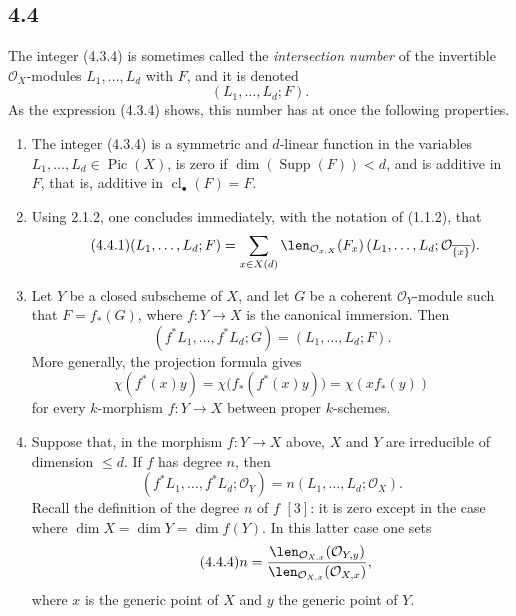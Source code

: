 \documentclass[11pt]{article}
\newcommand{\cl}{\operatorname{cl}}
\providecommand{\Pic}{\operatorname{Pic}}
\providecommand{\Supp}{\operatorname{Supp}}
\begin{document}
\subsection*{4.4}
The integer (4.3.4) is sometimes called the \emph{intersection number} of the invertible \(\mathcal O_X\)-modules \(L_1,\ldots,L_d\) with \(F\), and it is denoted
\[
 (L_1,\ldots,L_d;F).
\]
As the expression (4.3.4) shows, this number has at once the following properties.

\begin{enumerate}[label=\arabic*)]
\item The integer (4.3.4) is a symmetric and \(d\)-linear function in the variables \(L_1,\ldots,L_d\in\Pic(X)\), is zero if \(\dim(\Supp(F))<d\), and is additive in \(F\), that is, additive in \(\cl_\bullet(F)=F\).

\item Using 2.1.2, one concludes immediately, with the notation of (1.1.2), that
\begin{equation}\tag{4.4.1}
 (L_1,\ldots,L_d;F)=
 \sum_{x\in X(d)}
 \len_{\mathcal O_{x,X}}(F_x)\,
 (L_1,\ldots,L_d;\mathcal O_{\overline{\{x\}}}).
\end{equation}

\item Let \(Y\) be a closed subscheme of \(X\), and let \(G\) be a coherent \(\mathcal O_Y\)-module such that \(F=f_*(G)\), where \(f:Y\to X\) is the canonical immersion. Then
\[
 (f^*L_1,\ldots,f^*L_d;G)=(L_1,\ldots,L_d;F).
\]
More generally, the projection formula gives
\begin{equation}\tag{4.4.2}
 \chi(f^*(x)y)=\chi\bigl(f_*(f^*(x)y)\bigr)=\chi(xf_*(y))
\end{equation}
for every \(k\)-morphism \(f:Y\to X\) between proper \(k\)-schemes.

\item Suppose that, in the morphism \(f:Y\to X\) above, \(X\) and \(Y\) are irreducible of dimension \(\leq d\). If \(f\) has degree \(n\), then
\begin{equation}\tag{4.4.3}
 (f^*L_1,\ldots,f^*L_d;\mathcal O_Y)
 =
 n(L_1,\ldots,L_d;\mathcal O_X).
\end{equation}
Recall the definition of the degree \(n\) of \(f\) \([3]\): it is zero except in the case where \(\dim X=\dim Y=\dim f(Y)\). In this latter case one sets
\begin{equation}\tag{4.4.4}
 n=
 \frac{\len_{\mathcal O_{X,x}}(\mathcal O_{Y,y})}
      {\len_{\mathcal O_{X,x}}(\mathcal O_{X,x})},
\end{equation}
where \(x\) is the generic point of \(X\) and \(y\) the generic point of \(Y\).
\end{enumerate}
\end{document}
